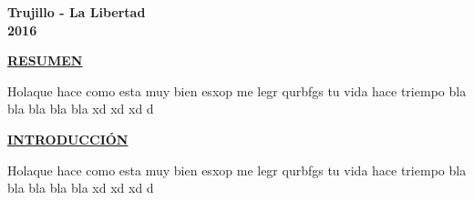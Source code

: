 \documentclass[a4paper, 12pt]{report}
\begin{document}
\vskip 3cm
\begin{center}    
	{\bf {\fontsize{14}{16.8}\selectfont Trujillo - La Libertad
	\\ 2016 }}
\end{center} 
\newpage
\pagestyle{plain}
\doublespacing
{}
\vspace*{6em}
\begin{center}
{\bf{\large{\underline{RESUMEN}}}}
\end{center}
\begin{justify}
Holaque hace como esta muy bien esxop me legr qurbfgs tu vida hace triempo bla bla bla bla bla xd xd xd d
\end{justify}
\newpage



\vspace*{6em}
\begin{center}
{\bf{\large{\underline{INTRODUCCI\'ON}}}}
\end{center}
\begin{justify}
Holaque hace como esta muy bien esxop me legr qurbfgs tu vida hace triempo bla bla bla bla bla xd xd xd d
\end{justify}
\newpage


\singlespacing
\renewcommand{\contentsname}{\centering\bf{\large{{\'INDICE GENERAL}}}}
\renewcommand{\listfigurename}{\centering\bf{\large{{LISTA DE TABLAS}}}}
\renewcommand{\listtablename}{\centering\bf{\large{{LISTA DE FIGURAS}}}}

\tableofcontents    %
\listoffigures      %
\listoftables       %

\doublespacing
\vspace*{5em}
\end{document}
